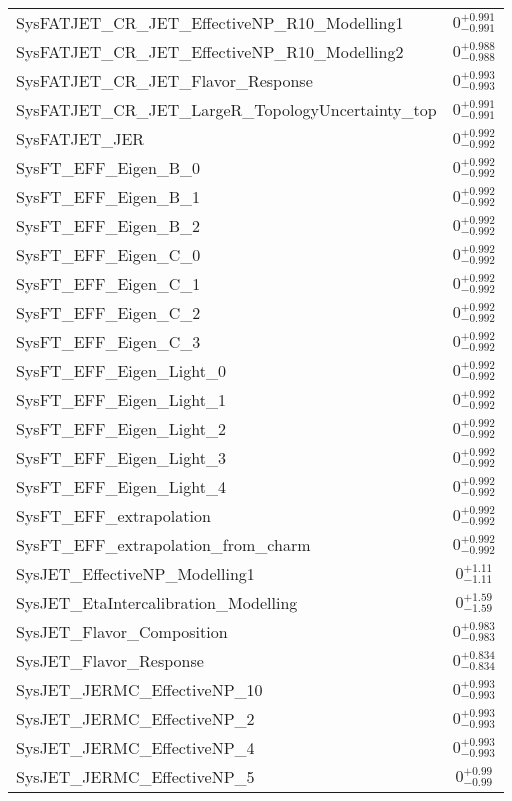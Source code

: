 \begin{tabular}{|l|c|}
SysFATJET\_CR\_JET\_EffectiveNP\_R10\_Modelling1 & $0^{+0.991}_{-0.991}$ \\
SysFATJET\_CR\_JET\_EffectiveNP\_R10\_Modelling2 & $0^{+0.988}_{-0.988}$ \\
SysFATJET\_CR\_JET\_Flavor\_Response & $0^{+0.993}_{-0.993}$ \\
SysFATJET\_CR\_JET\_LargeR\_TopologyUncertainty\_top & $0^{+0.991}_{-0.991}$ \\
SysFATJET\_JER & $0^{+0.992}_{-0.992}$ \\
SysFT\_EFF\_Eigen\_B\_0 & $0^{+0.992}_{-0.992}$ \\
SysFT\_EFF\_Eigen\_B\_1 & $0^{+0.992}_{-0.992}$ \\
SysFT\_EFF\_Eigen\_B\_2 & $0^{+0.992}_{-0.992}$ \\
SysFT\_EFF\_Eigen\_C\_0 & $0^{+0.992}_{-0.992}$ \\
SysFT\_EFF\_Eigen\_C\_1 & $0^{+0.992}_{-0.992}$ \\
SysFT\_EFF\_Eigen\_C\_2 & $0^{+0.992}_{-0.992}$ \\
SysFT\_EFF\_Eigen\_C\_3 & $0^{+0.992}_{-0.992}$ \\
SysFT\_EFF\_Eigen\_Light\_0 & $0^{+0.992}_{-0.992}$ \\
SysFT\_EFF\_Eigen\_Light\_1 & $0^{+0.992}_{-0.992}$ \\
SysFT\_EFF\_Eigen\_Light\_2 & $0^{+0.992}_{-0.992}$ \\
SysFT\_EFF\_Eigen\_Light\_3 & $0^{+0.992}_{-0.992}$ \\
SysFT\_EFF\_Eigen\_Light\_4 & $0^{+0.992}_{-0.992}$ \\
SysFT\_EFF\_extrapolation & $0^{+0.992}_{-0.992}$ \\
SysFT\_EFF\_extrapolation\_from\_charm & $0^{+0.992}_{-0.992}$ \\
SysJET\_EffectiveNP\_Modelling1 & $0^{+1.11}_{-1.11}$ \\
SysJET\_EtaIntercalibration\_Modelling & $0^{+1.59}_{-1.59}$ \\
SysJET\_Flavor\_Composition & $0^{+0.983}_{-0.983}$ \\
SysJET\_Flavor\_Response & $0^{+0.834}_{-0.834}$ \\
SysJET\_JERMC\_EffectiveNP\_10 & $0^{+0.993}_{-0.993}$ \\
SysJET\_JERMC\_EffectiveNP\_2 & $0^{+0.993}_{-0.993}$ \\
SysJET\_JERMC\_EffectiveNP\_4 & $0^{+0.993}_{-0.993}$ \\
SysJET\_JERMC\_EffectiveNP\_5 & $0^{+0.99}_{-0.99}$ \\

\end{tabular}
